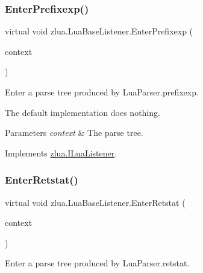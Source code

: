 \subsubsection{\texorpdfstring{Enter\+Prefixexp()}{EnterPrefixexp()}}
{\footnotesize\ttfamily virtual void zlua.\+Lua\+Base\+Listener.\+Enter\+Prefixexp (\begin{DoxyParamCaption}\item[{\mbox{[}\+Not\+Null\mbox{]} \mbox{\hyperlink{classzlua_1_1_lua_parser_1_1_prefixexp_context}{Lua\+Parser.\+Prefixexp\+Context}}}]{context }\end{DoxyParamCaption})\hspace{0.3cm}{\ttfamily [virtual]}}



Enter a parse tree produced by Lua\+Parser.\+prefixexp. 

The default implementation does nothing.


\begin{DoxyParams}{Parameters}
{\em context} & The parse tree.\\
\hline
\end{DoxyParams}


Implements \mbox{\hyperlink{interfacezlua_1_1_i_lua_listener_a77ffdad769c7c8266a678e93c529cdf6}{zlua.\+I\+Lua\+Listener}}.

\mbox{\label{classzlua_1_1_lua_base_listener_a48c1d90a5dbcce92c8f3f30e7a413f25}} 
\subsubsection{\texorpdfstring{Enter\+Retstat()}{EnterRetstat()}}
{\footnotesize\ttfamily virtual void zlua.\+Lua\+Base\+Listener.\+Enter\+Retstat (\begin{DoxyParamCaption}\item[{\mbox{[}\+Not\+Null\mbox{]} \mbox{\hyperlink{classzlua_1_1_lua_parser_1_1_retstat_context}{Lua\+Parser.\+Retstat\+Context}}}]{context }\end{DoxyParamCaption})\hspace{0.3cm}{\ttfamily [virtual]}}



Enter a parse tree produced by Lua\+Parser.\+retstat. 

